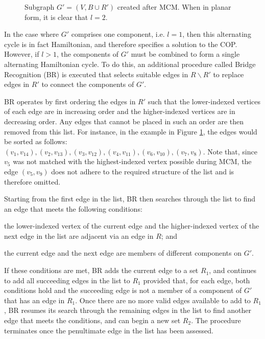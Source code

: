 \documentclass[runningheads]{llncs}
\begin{document}
\begin{figure}	
	\centering
	\begin{subfigure}[h]{0.4\textwidth}
		
	\end{subfigure} \quad
	\begin{subfigure}[h]{0.56\textwidth}
		
	\end{subfigure}
	\caption{Subgraph $G'= (V, B \cup R')$ created after MCM. When in planar form, it is clear that $l = 2$.}
	\label{fig:mps}
\end{figure}

\noindent In the case where $G'$ comprises one component, i.e. $l = 1$, then this alternating cycle is in fact Hamiltonian, and therefore specifies a solution to the COP. However, if $l > 1$, the components of $G'$ must be combined to form a single alternating Hamiltonian cycle. To do this, an additional procedure called Bridge Recognition (BR) is executed that selects suitable edges in $R\backslash R'$ to replace edges in $R'$ to connect the components of $G'$.

BR operates by first ordering the edges in $R'$ such that the lower-indexed vertices of each edge are in increasing order and the higher-indexed vertices are in decreasing order. Any edges that cannot be placed in such an order are then removed from this list. For instance, in the example in Figure \ref{fig:mps}, the edges would be sorted as follows: $(v_1, v_{14}), (v_2, v_{13}),(v_3, v_{12}),(v_4, v_{11}),(v_6, v_{10}),(v_7, v_8)$. Note that, since $v_5$ was not matched with the highest-indexed vertex possible during MCM, the edge $(v_5, v_9)$ does not adhere to the required structure of the list and is therefore omitted.

Starting from the first edge in the list, BR then searches through the list to find an edge that meets the following conditions: 
\begin{enumerate*}[label={(\alph*)}]
	\item the lower-indexed vertex of the current edge and the higher-indexed vertex of the next edge in the list are adjacent via an edge in $R$; and
	\item the current edge and the next edge are members of different components on $G'$.
\end{enumerate*}
If these conditions are met, BR adds the current edge to a set $R_1$, and continues to add all succeeding edges in the list to $R_1$ provided that, for each edge, both conditions hold and the succeeding edge is not a member of a component of $G'$ that has an edge in $R_1$. Once there are no more valid edges available to add to $R_1$, BR resumes its search through the remaining edges in the list to find another edge that meets the conditions, and can begin a new set $R_2$. The procedure terminates once the penultimate edge in the list has been assessed.
\end{document}
